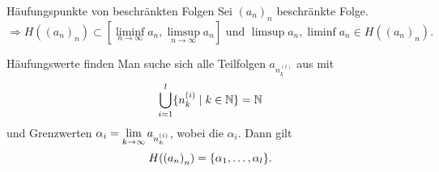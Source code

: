 \documentclass[main.tex]{subfiles}
\begin{document}
\begin{karte}{Häufungspunkte von beschränkten Folgen}
    Sei \({(a_n)}_n\) beschränkte Folge.
    \[ \Rightarrow H({(a_n)}_n) \subset 
    [ \liminf\limits_{n\rightarrow\infty}a_n, 
    \limsup\limits_{n\rightarrow\infty}a_n ] 
    \text{ und } \limsup a_n, \liminf a_n \in 
    H({(a_n)}_n). \]
\end{karte}
\begin{karte}{Häufungswerte finden}
    Man suche sich alle Teilfolgen \( a_{n_k^{(l)}} \) aus mit 
    \[ \bigcup_{i=1}^l \{ n_k^{(i)} \;\vert\; k\in \mathbb{N} \} = \mathbb{N} \]
    und Grenzwerten \( \alpha_i = \lim\limits_{k\rightarrow\infty} a_{n_k^{(i)}} \), 
    wobei die \( \alpha_i \).
    Dann gilt
    \[ H({(a_n)}_n) = \{ \alpha_1, \ldots, \alpha_l \}. \]
\end{karte}
\end{document}
